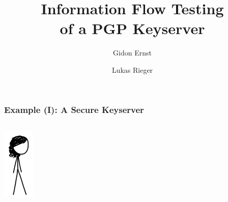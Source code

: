 \documentclass[12pt,english,dvipsnames]{beamer}
\author{Gidon Ernst \and Lukas Rieger}
\title{Information Flow Testing\\of a PGP Keyserver}
\institute{LMU Munich, Germany}
\date{}
\newcommand{\green}[1]{{\color{cpacheckergreen}#1}}
\begin{document}
\begin{frame}
  \titlepage
\end{frame}

\begin{frame}[fragile]
    \frametitle{Example (I): A \green{Secure} Keyserver}

    \begin{columns}[b]
        \begin{column}{1.5cm}
        \includegraphics[width=\textwidth]{images/meg.png}
        \end{column}


\end{columns}
\end{frame}
\end{document}
